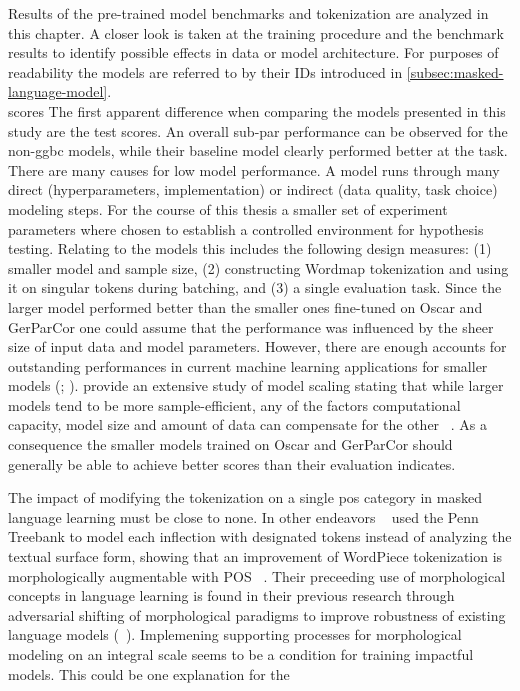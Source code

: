 Results of the pre-trained model benchmarks and tokenization are analyzed in this chapter.
A closer look is taken at the training procedure and the benchmark results to identify possible effects in data or model architecture.
For purposes of readability the models are referred to by their IDs introduced in \autoref{subsec:masked-language-model}.\\

scores
The first apparent difference when comparing the models presented in this study are the test scores.
An overall sub-par performance can be observed for the non-ggbc models, while their baseline model clearly performed better at the task.
There are many causes for low model performance.
A model runs through many direct (hyperparameters, implementation) or indirect (data quality, task choice) modeling steps.
For the course of this thesis a smaller set of experiment parameters where chosen to establish a controlled environment for hypothesis testing.
Relating to the models this includes the following design measures: (1) smaller model and sample size, (2) constructing Wordmap tokenization and using it on singular tokens during batching, and (3) a single evaluation task.
Since the larger model performed better than the smaller ones fine-tuned on Oscar and GerParCor one could assume that the performance was influenced by the sheer size of input data and model parameters.
However, there are enough accounts for outstanding performances in current machine learning applications for smaller models (\textcite{smallmodelbigbang}; \textcite{fewshotTHREEpercent}).
\citeauthor{scalinglaws} provide an extensive study of model scaling stating that while larger models tend to be more sample-efficient, any of the factors computational capacity, model size and amount of data can compensate for the other ~\cite[3]{scalinglaws}.
As a consequence the smaller models trained on Oscar and GerParCor should generally be able to achieve better scores than their evaluation indicates.

The impact of modifying the tokenization on a single \ac{pos} category in masked language learning must be close to none.
In other endeavors ~\citeauthor{BITE} used the Penn Treebank to model each inflection with designated tokens instead of analyzing the textual surface form, showing that an improvement of WordPiece tokenization is morphologically augmentable with \ac{POS} ~\citeyear{BITE}.
Their preceeding use of morphological concepts in language learning is found in their previous research through adversarial shifting of morphological paradigms to improve robustness of existing language models (~\cite[2927]{adversarialmorphin}).
Implemening supporting processes for morphological modeling on an integral scale seems to be a condition for training impactful models.
This could be one explanation for the

